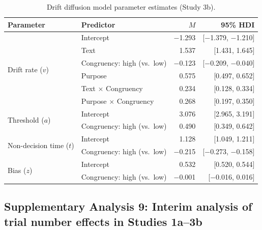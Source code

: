 \documentclass[pdflatex,sn-nature]{sn-jnl}
\begin{document}
\begin{appendices}
\begin{table}[htbp]
\caption{Drift diffusion model parameter estimates (Study 3b).}
\label{tab:S11}
\begin{tabular*}{\textwidth}{@{\extracolsep{\fill}}llrr@{}}
\toprule
Parameter & Predictor & $M$ & 95\% HDI \\
\midrule
\multirow{6}{*}{Drift rate ($v$)} & Intercept & $-$1.293 & [$-$1.379, $-$1.210] \\
 & Text                                  & 1.537  & [1.431, 1.645]   \\
 & Congruency: high (vs.\ low)           & $-$0.123 & [$-$0.209, $-$0.040] \\
 & Purpose                               & 0.575  & [0.497, 0.652]   \\
 & Text $\times$ Congruency              & 0.234  & [0.128, 0.334]   \\
 & Purpose $\times$ Congruency           & 0.268  & [0.197, 0.350]   \\
\midrule
\multirow{2}{*}{Threshold ($a$)} & Intercept & 3.076 & [2.965, 3.191] \\
 & Congruency: high (vs.\ low)           & 0.490  & [0.349, 0.642]   \\
\midrule
\multirow{2}{*}{Non-decision time ($t$)} & Intercept & 1.128 & [1.049, 1.211] \\
 & Congruency: high (vs.\ low)           & $-$0.215 & [$-$0.273, $-$0.158] \\
\midrule
\multirow{2}{*}{Bias ($z$)} & Intercept & 0.532 & [0.520, 0.544] \\
 & Congruency: high (vs.\ low)           & $-$0.001 & [$-$0.016, 0.016] \\
\bottomrule
\end{tabular*}
\end{table}

\clearpage

\FloatBarrier

\subsection*{Supplementary Analysis 9: Interim analysis of trial number effects in Studies 1a--3b}
\label{supp:analysis9}


\end{appendices}
\end{document}
